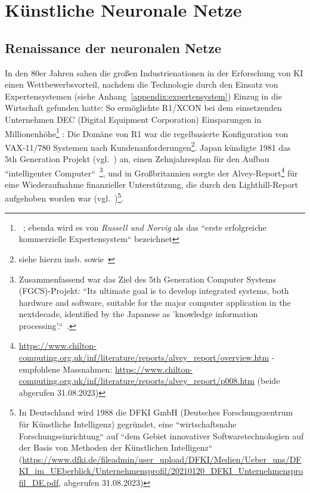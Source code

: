 \chapter{Künstliche Neuronale Netze}


\section{Renaissance der neuronalen Netze}\label{renaissance}


In den 80er Jahren sahen die großen Industrienationen in der Erforschung von KI einen Wettbewerbsvorteil, nachdem die Technologie durch den Einsatz von Expertensystemen (siehe Anhang~\ref{appendix:expertensystem}) Einzug in die Wirtschaft gefunden hatte: So ermöglichte R1/XCON bei dem einsetzenden Unternehmen DEC (Digital Equipment Corporation) Einsparungen in Millionenhöhe\footnote{
    ~\cite[48]{RN09}; ebenda wird es von \textit{Russell und Norvig} als das ``erste erfolgreiche kommerzielle Expertensystem`` bezeichnet
} : Die Domäne von R1 war die regelbasierte Konfiguration von VAX-11/780 Systemen nach Kundenanforderungen\footnote{
    siehe hierzu insb. \cite{Mcd80} sowie~\cite[63]{Hor90}
}. Japan kündigte 1981 das 5th Generation Projekt (vgl.~\cite{Gar19}) an, einen Zehnjahresplan für den Aufbau ``intelligenter Computer``~\cite[48]{RN09}\footnote{
    Zusammenfassend war das Ziel des 5th Generation Computer Systems (FGCS)-Projekt: ``Its ultimate goal is to develop integrated systems, both hardware and software, suitable for the major computer application in the nextdecade, identified by the Japanese as 'knowledge information processing'.``~\cite[637]{Sha83}.
}, und in Großbritannien sorgte der Alvey-Report\footnote{
    \url{https://www.chilton-computing.org.uk/inf/literature/reports/alvey\_report/overview.htm} - empfohlene Massnahmen: \url{https://www.chilton-computing.org.uk/inf/literature/reports/alvey\_report/p008.htm} (beide abgerufen 31.08.2023)
} für eine Wiederaufnahme finanzieller Unterstützung, die durch den Lighthill-Report aufgehoben worden war (vgl.~\cite[48]{RN09})\footnote{
    In Deutschland wird 1988 die DFKI GmbH (Deutsches Forschungszentrum für Künstliche Intelligenz) gegründet, eine ``wirtschaftsnahe Forschungseinrichtung`` auf ``dem Gebiet innovativer Softwaretechnologien auf der Basis von Methoden der Künstlichen Intelligenz`` (\url{https://www.dfki.de/fileadmin/user\_upload/DFKI/Medien/Ueber\_uns/DFKI\_im\_UEberblick/Unternehmensprofil/20210120\_DFKI\_Unternehmensprofil\_DE.pdf}, abgerufen 31.08.2023)
}.

